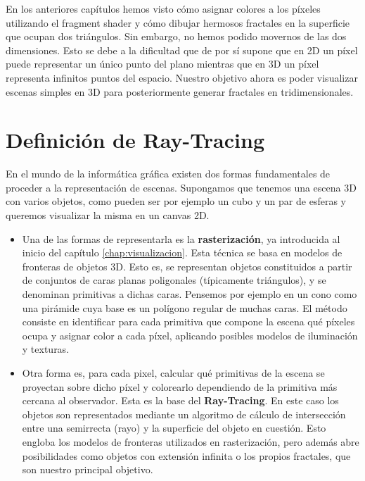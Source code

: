 %
%

En los anteriores capítulos hemos visto cómo asignar colores a los píxeles utilizando el fragment shader y cómo dibujar hermosos fractales en la superficie que ocupan dos triángulos. Sin embargo, no hemos podido movernos de las dos dimensiones. Esto se debe a la dificultad que de por sí supone que en 2D un píxel puede representar un único punto del plano mientras que en 3D un píxel representa infinitos puntos del espacio. Nuestro objetivo ahora es poder visualizar escenas simples en 3D para posteriormente generar fractales en tridimensionales.

\section{Definición de Ray-Tracing}

En el mundo de la informática gráfica existen dos formas fundamentales de proceder a la representación de escenas. Supongamos que tenemos una escena 3D con varios objetos, como pueden ser por ejemplo un cubo y un par de esferas y queremos visualizar la misma en un canvas 2D.
\begin{itemize}
    \item Una de las formas de representarla es la \textbf{rasterización}, ya introducida al inicio del capítulo \ref{chap:visualizacion}. Esta técnica se basa en modelos de fronteras de objetos 3D. Esto es, se representan objetos constituidos a partir de conjuntos de caras planas poligonales (típicamente triángulos), y se denominan primitivas a dichas caras. Pensemos por ejemplo en un cono como una pirámide cuya base es un polígono regular de muchas caras. El método consiste en identificar para cada primitiva que compone la escena qué píxeles ocupa y asignar color a cada píxel, aplicando posibles modelos de iluminación y texturas.
    \item Otra forma es, para cada pixel, calcular qué primitivas de la escena se proyectan sobre dicho píxel y colorearlo dependiendo de la primitiva más cercana al observador. Esta es la base del \textbf{Ray-Tracing}. En este caso los objetos son representados mediante un algoritmo de cálculo de intersección entre una semirrecta (rayo) y la superficie del objeto en cuestión. Esto engloba los modelos de fronteras utilizados en rasterización, pero además abre posibilidades como objetos con extensión infinita o los propios fractales, que son nuestro principal objetivo.
\end{itemize}

